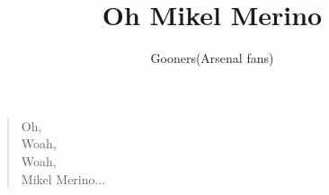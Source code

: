 \documentclass[a4paper,12pt]{article}
\title{Oh Mikel Merino}
\author{Gooners(Arsenal fans)}
\date{}
\begin{document}
	
	\maketitle
	
	\begin{verse}
		
		Oh, \\
		Woah, \\
		Woah, \\
		Mikel Merino$\ldots$
		
	\end{verse}
	
\end{document}
